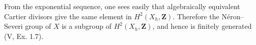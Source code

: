 From the exponential sequence, one sees easily that algebraically equivalent Cartier divisors give the same element in $H^2(X_h, \mathbf{Z})$. Therefore the Néron–Severi group of $X$ is a subgroup of $H^2(X_h, \mathbf{Z})$, and hence is finitely generated (V, Ex. 1.7).
